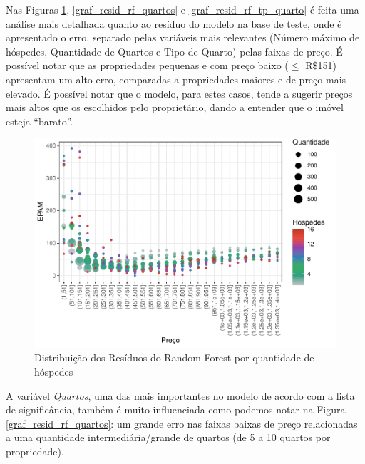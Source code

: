 \documentclass[
	12pt,				%
	a4paper,		%
	oneside,    %
	chapter=TITLE,		   %
	section=TITLE,		   %
	subsection=TITLE,	   %
	subsubsection=TITLE, %
	english,			%
	french,				%
	spanish,			%
	brazil,				%
]{abntex2}
\begin{document}
Nas Figuras \ref{graf_resid_rf_acom}, \ref{graf_resid_rf_quartos} e
\ref{graf_resid_rf_tp_quarto} é feita uma análise mais detalhada quanto
ao resíduo do modelo na base de teste, onde é apresentado o erro,
separado pelas variáveis mais relevantes (Número máximo de hóspedes,
Quantidade de Quartos e Tipo de Quarto) pelas faixas de preço. É
possível notar que as propriedades pequenas e com preço baixo (\(\leq\)
R\$151) apresentam um alto erro, comparadas a propriedades maiores e de
preço mais elevado. É possível notar que o modelo, para estes casos,
tende a sugerir preços mais altos que os escolhidos pelo proprietário,
dando a entender que o imóvel esteja ``barato''.

\begin{figure}
\centering
\includegraphics{00-TCC_files/figure-latex/graf_resid_rf_acom-1.pdf}
\caption{\label{graf_resid_rf_acom}Distribuição dos Resíduos do Random
Forest por quantidade de hóspedes}
\end{figure}

A variável \emph{Quartos}, uma das mais importantes no modelo de acordo
com a lista de significância, também é muito influenciada como podemos
notar na Figura \ref{graf_resid_rf_quartos}: um grande erro nas faixas
baixas de preço relacionadas a uma quantidade intermediária/grande de
quartos (de 5 a 10 quartos por propriedade).
\end{document}

